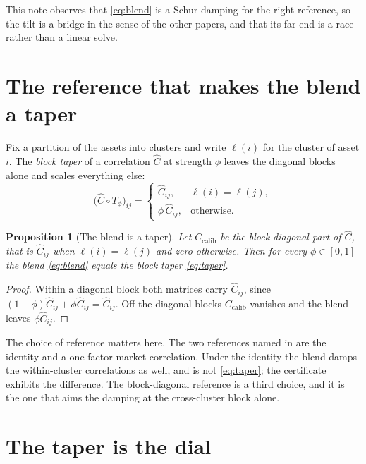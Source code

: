 \documentclass[11pt]{article}
\newtheorem{proposition}{Proposition}
\begin{document}
This note observes that \eqref{eq:blend} is a Schur damping for the right
reference, so the tilt is a bridge in the sense of the other papers, and that
its far end is a race rather than a linear solve.

\section{The reference that makes the blend a taper}

Fix a partition of the assets into clusters and write $\ell(i)$ for the cluster
of asset $i$. The \emph{block taper} of a correlation $\widehat C$ at strength
$\phi$ leaves the diagonal blocks alone and scales everything else:
\begin{equation}
  \big(\widehat C\circ T_\phi\big)_{ij}
  =\begin{cases}\widehat C_{ij}, & \ell(i)=\ell(j),\\[2pt]
                \phi\,\widehat C_{ij}, & \text{otherwise.}\end{cases}
  \label{eq:taper}
\end{equation}

\begin{proposition}[The blend is a taper]
\label{prop:taper}
Let $C_{\mathrm{calib}}$ be the block-diagonal part of $\widehat C$, that is
$\widehat C_{ij}$ when $\ell(i)=\ell(j)$ and zero otherwise. Then for every
$\phi\in[0,1]$ the blend \eqref{eq:blend} equals the block taper
\eqref{eq:taper}.
\end{proposition}

\begin{proof}
Within a diagonal block both matrices carry $\widehat C_{ij}$, since
$(1-\phi)\widehat C_{ij}+\phi\widehat C_{ij}=\widehat C_{ij}$. Off the diagonal
blocks $C_{\mathrm{calib}}$ vanishes and the blend leaves $\phi\widehat C_{ij}$.
\end{proof}

The choice of reference matters here. The two references named in
\cite{cotton2026thurstone} are the identity and a one-factor market correlation.
Under the identity the blend damps the within-cluster correlations as well, and
is not \eqref{eq:taper}; the certificate exhibits the difference. The
block-diagonal reference is a third choice, and it is the one that aims the
damping at the cross-cluster block alone.

\section{The taper is the dial}
\end{document}
